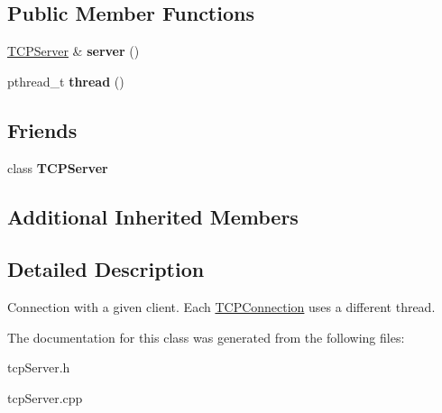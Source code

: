 \subsection*{Public Member Functions}
\begin{DoxyCompactItemize}
\item 
\hypertarget{classcppu_1_1TCPConnection_a4186946c7c22e3c2cebe3a97aa78f5f7}{}\hyperlink{classcppu_1_1TCPServer}{T\+C\+P\+Server} \& {\bfseries server} ()\label{classcppu_1_1TCPConnection_a4186946c7c22e3c2cebe3a97aa78f5f7}

\item 
\hypertarget{classcppu_1_1TCPConnection_a4663875b80fced790502880c72e6e672}{}pthread\+\_\+t {\bfseries thread} ()\label{classcppu_1_1TCPConnection_a4663875b80fced790502880c72e6e672}

\end{DoxyCompactItemize}
\subsection*{Friends}
\begin{DoxyCompactItemize}
\item 
\hypertarget{classcppu_1_1TCPConnection_ae4cfdb1814d91a8d28dadb49adda68f0}{}class {\bfseries T\+C\+P\+Server}\label{classcppu_1_1TCPConnection_ae4cfdb1814d91a8d28dadb49adda68f0}

\end{DoxyCompactItemize}
\subsection*{Additional Inherited Members}


\subsection{Detailed Description}
Connection with a given client. Each \hyperlink{classcppu_1_1TCPConnection}{T\+C\+P\+Connection} uses a different thread. 

The documentation for this class was generated from the following files\+:\begin{DoxyCompactItemize}
\item 
tcp\+Server.\+h\item 
tcp\+Server.\+cpp\end{DoxyCompactItemize}
